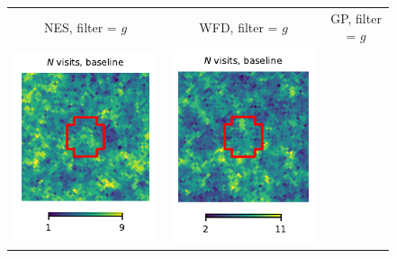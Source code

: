 \documentclass[preprintm,linenumbers]{aastex631}
\begin{document}
  

  	\begin{figure}
			\centering
			\begin{tabular}{c c c}
                 NES, filter = $g$ & WFD, filter = $g$ & GP, filter = $g$ \\
				\includegraphics{results/skymaps_cutout/skymaps_cutout_first_year_one_snap_v4_0_10yrs_db_noDD_noTwi_nside-256_CountMetric_g_NES_noDD_noTwi.pdf} &
				\includegraphics{results/skymaps_cutout/skymaps_cutout_first_year_one_snap_v4_0_10yrs_db_noDD_noTwi_nside-256_CountMetric_g_WFD_noDD_noTwi.pdf} &

\end{tabular}
\end{figure}
\end{document}

